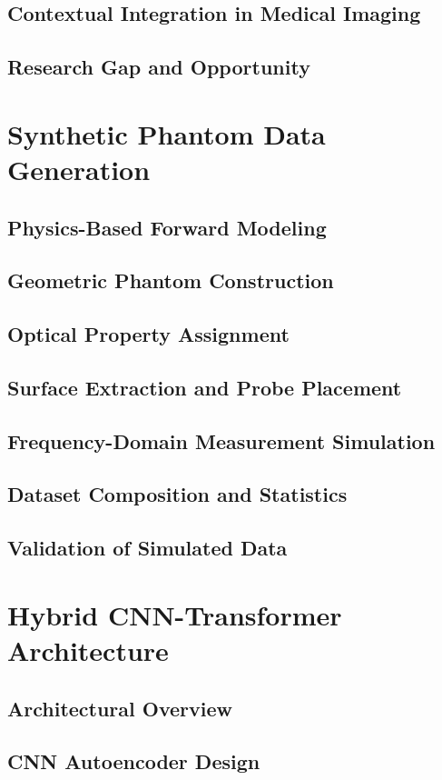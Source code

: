\documentclass[12pt,a4paper]{report}
\begin{document}
\section{Contextual Integration in Medical Imaging}
\section{Research Gap and Opportunity}

\chapter{Synthetic Phantom Data Generation}
\section{Physics-Based Forward Modeling}
\section{Geometric Phantom Construction}
\section{Optical Property Assignment}
\section{Surface Extraction and Probe Placement}
\section{Frequency-Domain Measurement Simulation}
\section{Dataset Composition and Statistics}
\section{Validation of Simulated Data}

\chapter{Hybrid CNN-Transformer Architecture}
\section{Architectural Overview}
\section{CNN Autoencoder Design}
\end{document}
